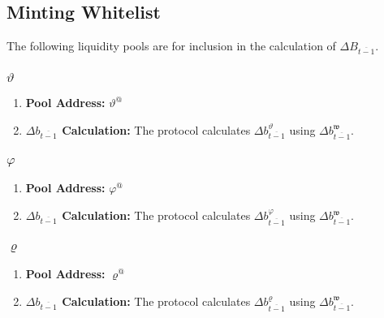 \documentclass[class=article, crop=false]{standalone}
\begin{document}

\subsection{Minting Whitelist}

The following liquidity pools are  for inclusion in the calculation of $\Delta B_{\overline{t-1}}$.


\subsubsection{$\vartheta$}

    \begin{enumerate}
        \item \textbf{Pool Address:} $\vartheta^{@}$
            
        \item \textbf{$\Delta b_{\overline{t-1}}$ Calculation:} The protocol calculates $\Delta b_{\overline{t-1}}^{\vartheta}$ using $\Delta b_{\overline{t-1}}^{\mathfrak{w}}$.
    \end{enumerate}


\subsubsection{$\varphi$}

    \begin{enumerate}
        \item \textbf{Pool Address:} $\varphi^{@}$
            
        \item \textbf{$\Delta b_{\overline{t-1}}$ Calculation:} The protocol calculates $\Delta b_{\overline{t-1}}^{\varphi}$ using $\Delta b_{\overline{t-1}}^{\mathfrak{w}}$.
    \end{enumerate}


\subsubsection{$\varrho$}

    \begin{enumerate}
        \item \textbf{Pool Address:} $\varrho^{@}$
            
        \item \textbf{$\Delta b_{\overline{t-1}}$ Calculation:} The protocol calculates $\Delta b_{\overline{t-1}}^{\varrho}$ using $\Delta b_{\overline{t-1}}^{\mathfrak{w}}$.
    \end{enumerate}
\end{document}
